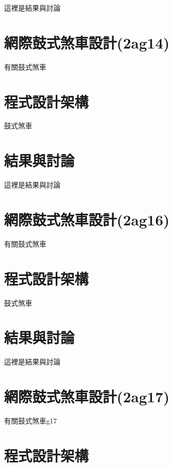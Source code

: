 \documentclass[]{article}
\begin{document}
這裡是結果與討論

\section{網際鼓式煞車設計(2ag14)}\label{ux7db2ux969bux9f13ux5f0fux715eux8ecaux8a2dux8a082ag14}

有關鼓式煞車

\section{程式設計架構}\label{ux7a0bux5f0fux8a2dux8a08ux67b6ux69cb-10}

鼓式煞車

\section{結果與討論}\label{ux7d50ux679cux8207ux8a0eux8ad6-11}

這裡是結果與討論

\section{網際鼓式煞車設計(2ag16)}\label{ux7db2ux969bux9f13ux5f0fux715eux8ecaux8a2dux8a082ag16}

有關鼓式煞車

\section{程式設計架構}\label{ux7a0bux5f0fux8a2dux8a08ux67b6ux69cb-11}

鼓式煞車

\section{結果與討論}\label{ux7d50ux679cux8207ux8a0eux8ad6-12}

這裡是結果與討論

\section{網際鼓式煞車設計(2ag17)}\label{ux7db2ux969bux9f13ux5f0fux715eux8ecaux8a2dux8a082ag17}

有關鼓式煞車g17

\section{程式設計架構}\label{ux7a0bux5f0fux8a2dux8a08ux67b6ux69cb-12}
\end{document}
